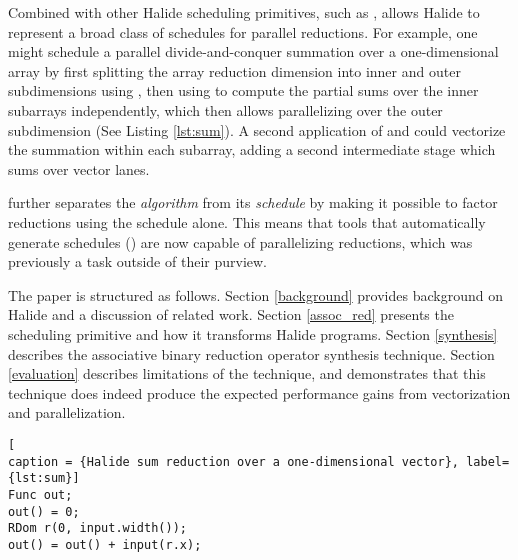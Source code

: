 Combined with other Halide scheduling primitives, such as ,  allows Halide to represent a broad class of schedules for parallel reductions. For example, one might schedule a parallel divide-and-conquer summation over a one-dimensional array by first splitting the array reduction dimension into inner and outer subdimensions using , then using  to compute the partial sums over the inner subarrays independently, which then allows parallelizing over the outer subdimension (See Listing \ref{lst:sum}). A second application of  and  could vectorize the summation within each subarray, adding a second intermediate stage which sums over vector lanes.

 further separates the \emph{algorithm} from its \emph{schedule} by making it possible to factor reductions using the schedule alone. This means that tools that automatically generate schedules (\cite{Mullapudi:2016:ASH:2897824.2925952}\cite{Ragan-Kelley:2013:HLC:2491956.2462176}) are now capable of parallelizing reductions, which was previously a task outside of their purview.


The paper is structured as follows. Section \ref{background} provides background on Halide and a discussion of related work. Section \ref{assoc_red} presents the  scheduling primitive and how it transforms Halide programs. Section \ref{synthesis} describes the associative binary reduction operator synthesis technique. Section \ref{evaluation} describes limitations of the technique, and demonstrates that this technique does indeed produce the expected performance gains from vectorization and parallelization.

\begin{lstlisting}[
caption = {Halide sum reduction over a one-dimensional vector}, label={lst:sum}]
Func out;
out() = 0;
RDom r(0, input.width());
out() = out() + input(r.x);
\end{lstlisting}

